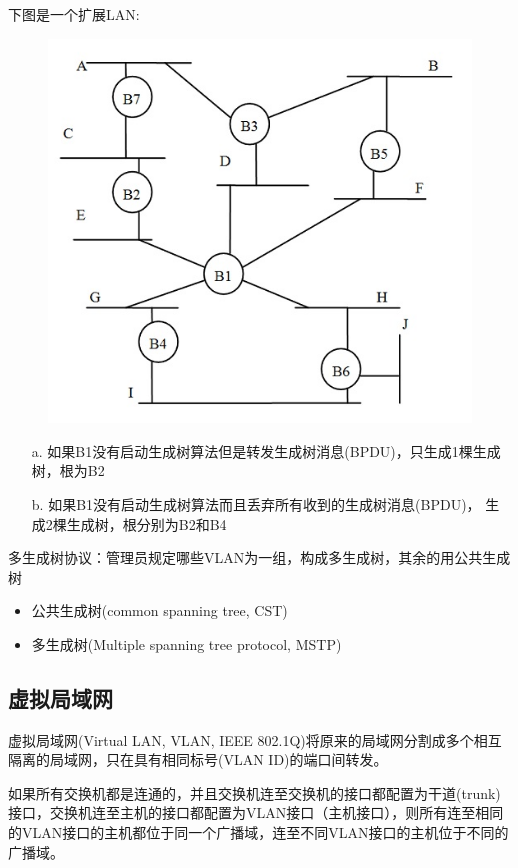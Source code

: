\begin{example}
	下图是一个扩展LAN:
	\begin{figure}[H]
		\centering
		\includegraphics[width=0.4\linewidth]{fig/spanning_tree.jpg}
	\end{figure}
\end{example}
\begin{analysis}
	\begin{itemize}
		\item[a.] 如果B1没有启动生成树算法但是转发生成树消息(BPDU)，只生成1棵生成树，根为B2
		\item[b.] 如果B1没有启动生成树算法而且丢弃所有收到的生成树消息(BPDU)，
		生成2棵生成树，根分别为B2和B4
	\end{itemize}
\end{analysis}

\myhline
多生成树协议：管理员规定哪些VLAN为一组，构成多生成树，其余的用公共生成树
\begin{itemize}
	\item 公共生成树(common spanning tree, CST)
	\item 多生成树(Multiple spanning tree protocol, MSTP)
\end{itemize}

\subsection{虚拟局域网}
虚拟局域网(Virtual LAN, VLAN, IEEE 802.1Q)将原来的局域网分割成多个相互隔离的局域网，只在具有相同标号(VLAN ID)的端口间转发。

如果所有交换机都是连通的，并且交换机连至交换机的接口都配置为干道(trunk)接口，交换机连至主机的接口都配置为VLAN接口（主机接口），则所有连至相同的VLAN接口的主机都位于同一个广播域，连至不同VLAN接口的主机位于不同的广播域。

